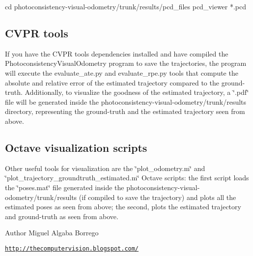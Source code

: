 \begin{DoxyVerb}
cd photoconsistency-visual-odometry/trunk/results/pcd_files
pcd_viewer *.pcd 
\end{DoxyVerb}


 \hypertarget{index_B}{}\subsection{CVPR tools}\label{index_B}
If you have the CVPR tools dependencies installed and have compiled the PhotoconsistencyVisualOdometry program to save the trajectories, the program will execute the evaluate\_\-ate.py and evaluate\_\-rpe.py tools that compute the absolute and relative error of the estimated trajectory compared to the ground-\/truth. Additionally, to visualize the goodness of the estimated trajectory, a \char`\"{}.pdf\char`\"{} file will be generated inside the photoconsistency-\/visual-\/odometry/trunk/results directory, representing the ground-\/truth and the estimated trajectory seen from above.

 \hypertarget{index_C}{}\subsection{Octave visualization scripts}\label{index_C}
Other useful tools for visualization are the \char`\"{}plot\_\-odometry.m\char`\"{} and \char`\"{}plot\_\-trajectory\_\-groundtruth\_\-estimated.m\char`\"{} Octave scripts: the first script loads the \char`\"{}poses.mat\char`\"{} file generated inside the photoconsistency-\/visual-\/odometry/trunk/results (if compiled to save the trajectory) and plots all the estimated poses as seen from above; the second, plots the estimated trajectory and ground-\/truth as seen from above.

  \begin{DoxyAuthor}{Author}
Miguel Algaba Borrego \par
 \href{http://thecomputervision.blogspot.com/}{\tt http://thecomputervision.blogspot.com/} 
\end{DoxyAuthor}
